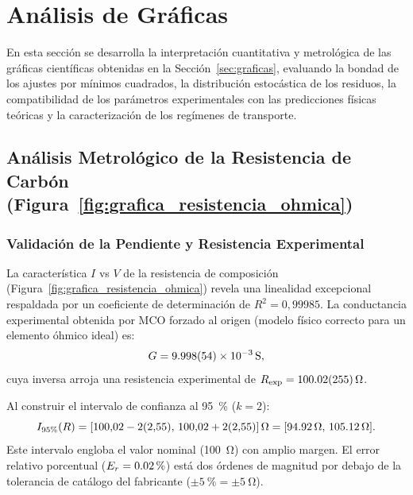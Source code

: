 
\section{Análisis de Gráficas}
\label{sec:analisis_graficas}

En esta sección se desarrolla la interpretación cuantitativa y metrológica de las gráficas científicas obtenidas en la Sección~\ref{sec:graficas}, evaluando la bondad de los ajustes por mínimos cuadrados, la distribución estocástica de los residuos, la compatibilidad de los parámetros experimentales con las predicciones físicas teóricas y la caracterización de los regímenes de transporte.

\subsection{Análisis Metrológico de la Resistencia de Carbón (Figura~\ref{fig:grafica_resistencia_ohmica})}
\subsubsection{Validación de la Pendiente y Resistencia Experimental}
La característica $I$ vs $V$ de la resistencia de composición (Figura~\ref{fig:grafica_resistencia_ohmica}) revela una linealidad excepcional respaldada por un coeficiente de determinación de $R^2 = 0{,}99985$. La conductancia experimental obtenida por MCO forzado al origen (modelo físico correcto para un elemento óhmico ideal) es:
\begin{equation}
    G = \qty{9{,}998 \pm 0{,}054e-3}{\siemens},
\end{equation}
cuya inversa arroja una resistencia experimental de $R_{\text{exp}} = \qty{100{,}02 \pm 2{,}55}{\ohm}$.

Al construir el intervalo de confianza al \qty{95}{\percent} ($k = 2$):
\begin{equation}
    I_{95\%}(R) = [100{,}02 - 2(2{,}55),\, 100{,}02 + 2(2{,}55)]\,\unit{\ohm} = [\qty{94{,}92}{\ohm},\, \qty{105{,}12}{\ohm}].
\end{equation}
Este intervalo engloba el valor nominal (\qty{100}{\ohm}) con amplio margen. El error relativo porcentual ($E_r = \qty{0{,}02}{\percent}$) está dos órdenes de magnitud por debajo de la tolerancia de catálogo del fabricante ($\pm\qty{5}{\percent} = \pm\qty{5}{\ohm}$).

